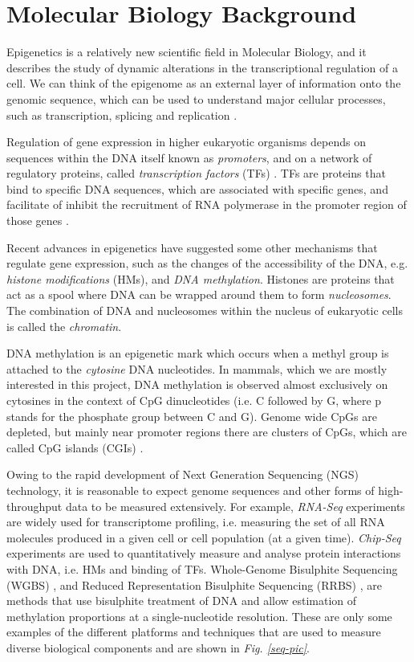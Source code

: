 \section{Molecular Biology Background} \label{molecular-back-sect}
Epigenetics is a relatively new scientific field in Molecular Biology, and it describes the study of dynamic alterations in the transcriptional regulation of a cell. We can think of the epigenome as an external layer of information onto the genomic sequence, which can be used to understand major cellular processes, such as transcription, splicing and replication \citep{Furey2012}.

Regulation of gene expression in higher eukaryotic organisms depends on sequences within the DNA itself known as \emph{promoters}, and on a network of regulatory proteins, called \emph{transcription factors} (TFs) \citep{Jasny2001}. TFs are proteins that bind to specific DNA sequences, which are associated with specific genes, and facilitate of inhibit the recruitment of RNA polymerase in the promoter region of those genes \citep{Ptashne2002}. 

Recent advances in epigenetics have suggested some other mechanisms that regulate gene expression, such as the changes of the accessibility of the DNA, e.g. \emph{histone modifications} (HMs), and \emph{DNA methylation}. Histones are proteins that act as a spool where DNA can be wrapped around them to form \emph{nucleosomes}. The combination of DNA and nucleosomes within the nucleus of eukaryotic cells is called the \emph{chromatin}. 

DNA methylation is an epigenetic mark which occurs when a methyl group is attached to the \emph{cytosine} DNA nucleotides. In mammals, which we are mostly interested in this project, DNA methylation is observed almost exclusively on cytosines in the context of CpG dinucleotides (i.e. C followed by G, where p stands for the phosphate group between C and G). Genome wide CpGs are depleted, but mainly near promoter regions there are clusters of CpGs, which are called CpG islands (CGIs) \citep{Bird2002}. 

Owing to the rapid development of Next Generation Sequencing (NGS) technology, it is reasonable to expect genome sequences and other forms of high-throughput data to be measured extensively. For example, \emph{RNA-Seq} experiments \citep{Wang2009} are widely used for transcriptome profiling, i.e. measuring the set of all RNA molecules produced in a given cell or cell population (at a given time). \emph{Chip-Seq} experiments \citep{Park2009} are used to quantitatively measure and analyse protein interactions with DNA, i.e. HMs and binding of TFs. Whole-Genome Bisulphite Sequencing (WGBS) \citep{Frommer1992}, and Reduced Representation Bisulphite Sequencing (RRBS) \citep{Meissner2008}, are methods that use bisulphite treatment of DNA and allow estimation of methylation proportions at a single-nucleotide resolution. These are only some examples of the different platforms and techniques that are used to measure diverse biological components and are shown in \emph{Fig. \ref{seq-pic}}. 

